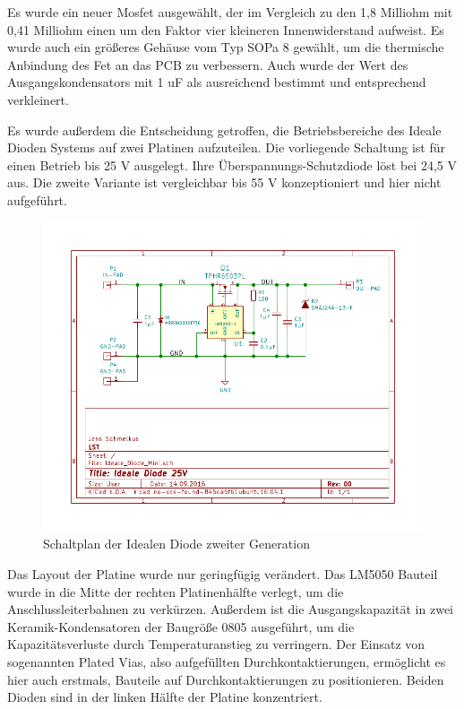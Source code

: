Es wurde ein neuer Mosfet ausgewählt, der im Vergleich zu den 1,8 Milliohm mit 0,41 Milliohm einen um den Faktor vier kleineren Innenwiderstand aufweist. Es wurde auch ein größeres Gehäuse vom Typ SOPa 8 gewählt, um die thermische Anbindung des Fet an das PCB zu verbessern.
Auch wurde der Wert des Ausgangskondensators mit 1 uF als ausreichend bestimmt und entsprechend verkleinert.

Es wurde außerdem die Entscheidung getroffen, die Betriebsbereiche des Ideale Dioden Systems auf zwei Platinen aufzuteilen. Die vorliegende Schaltung ist für einen Betrieb bis 25 V ausgelegt. Ihre Überspannungs-Schutzdiode löst bei 24,5 V aus.
Die zweite Variante ist vergleichbar bis 55 V konzeptioniert und hier nicht aufgeführt.


\begin{figure}[H]
\centering
\includegraphics[width=1.0\textwidth]{Schaltplaene/Ideale_Diode_25V_rev00-ver00.pdf} 
\caption{Schaltplan der Idealen Diode zweiter Generation} 
\label{fig:Schaltplan der Idealen Diode zweiter Generation}
\end{figure}

Das Layout der Platine wurde nur geringfügig verändert. Das LM5050 Bauteil wurde in die Mitte der rechten Platinenhälfte verlegt, um die Anschlussleiterbahnen zu verkürzen. Außerdem ist die Ausgangskapazität in zwei Keramik-Kondensatoren der Baugröße 0805 ausgeführt, um die Kapazitätsverluste durch Temperaturanstieg zu verringern.
Der Einsatz von sogenannten Plated Vias, also aufgefüllten Durchkontaktierungen, ermöglicht es hier auch erstmals, Bauteile auf Durchkontaktierungen zu positionieren.
Beiden Dioden sind in der linken Hälfte der Platine konzentriert.

